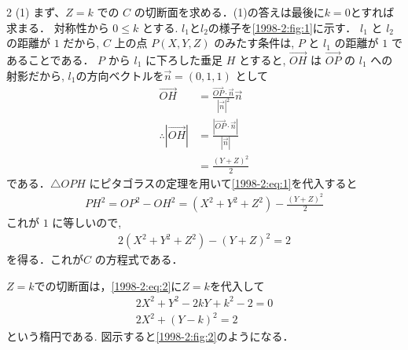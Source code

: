\documentclass[../../main.tex]{subfiles}
\begin{document}
\begin{multicols}{2}
  (1)
  まず、$Z = k$ での $C$ の切断面を求める．(1)の答えは最後に$k=0$とすれば求まる．
  対称性から $0 \le k$ とする.
  $l_1$と$l_2$の様子を\cref{1998-2:fig:1}に示す．
  $l_1$ と $l_2$ の距離が $1$ だから, $C$ 上の点 $P(X,Y,Z)$ のみたす条件は,
  $P$ と $l_1$ の距離が $1$ であることである．
  $P$ から $l_1$ に下ろした垂足 $H$ とすると,
  $\vec{OH}$ は $\vec{OP}$ の $l_1$ への射影だから,
  $l_1$の方向ベクトルを$\vec{n}=(0,1,1)$ として
  \begin{align}
    \vec{OH}
     & = \frac{\vec{OP} \cdot \vec{n}}{|\vec{n}|^2} \vec{n} \nonumber \\
    \therefore
    \left|\vec{OH}\right|
     & = \frac{|\vec{OP}\cdot\vec{n}|}{|\vec{n}|}      \nonumber      \\
     & = \frac{(Y+Z)^2}{2} \label{1998-2:eq:1}
  \end{align}
  である．$\triangle OPH$ にピタゴラスの定理を用いて\cref{1998-2:eq:1}を代入すると
  \begin{align*}
    PH^2 = OP^2 - OH^2 = (X^2+Y^2+Z^2) - \frac{(Y+Z)^2}{2}
  \end{align*}
  これが $1$ に等しいので,
  \begin{align}
    2(X^2+Y^2+Z^2) - (Y+Z)^2 = 2 \label{1998-2:eq:2}
  \end{align}
  を得る．これが$C$ の方程式である．

  $Z=k$での切断面は，\cref{1998-2:eq:2}に$Z=k$を代入して
  \begin{align}
    2X^2 + Y^2 - 2kY + k^2 - 2 = 0 \nonumber \\
    2X^2 + (Y-k)^2 = 2 \label{1998-2:eq:3}
  \end{align}
  という楕円である. 図示すると\cref{1998-2:fig:2}のようになる．

  \begin{figure}[H]
    \centering
\end{figure}
\end{multicols}
\end{document}
